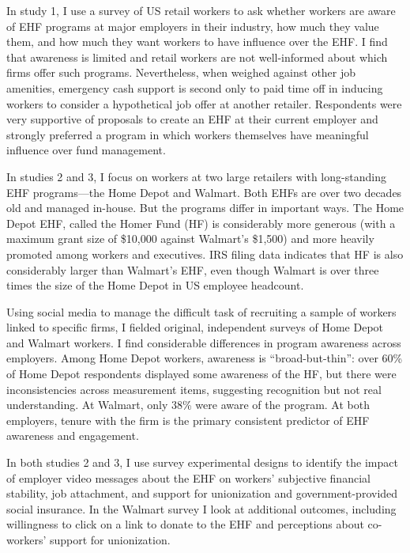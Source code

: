\documentclass[
  11pt,
  oneside]{article}
\begin{document}
In study 1, I use a survey of US retail workers to ask whether workers are aware of EHF programs at major employers in their industry, how much they value them, and how much they want workers to have influence over the EHF. I find that awareness is limited and retail workers are not well-informed about which firms offer such programs. Nevertheless, when weighed against other job amenities, emergency cash support is second only to paid time off in inducing workers to consider a hypothetical job offer at another retailer. Respondents were very supportive of proposals to create an EHF at their current employer and strongly preferred a program in which workers themselves have meaningful influence over fund management.

In studies 2 and 3, I focus on workers at two large retailers with long-standing EHF programs---the Home Depot and Walmart. Both EHFs are over two decades old and managed in-house. But the programs differ in important ways. The Home Depot EHF, called the Homer Fund (HF) is considerably more generous (with a maximum grant size of \$10,000 against Walmart's \$1,500) and more heavily promoted among workers and executives. IRS filing data indicates that HF is also considerably larger than Walmart's EHF, even though Walmart is over three times the size of the Home Depot in US employee headcount.

Using social media to manage the difficult task of recruiting a sample of workers linked to specific firms, I fielded original, independent surveys of Home Depot and Walmart workers. I find considerable differences in program awareness across employers. Among Home Depot workers, awareness is ``broad-but-thin'': over 60\% of Home Depot respondents displayed some awareness of the HF, but there were inconsistencies across measurement items, suggesting recognition but not real understanding. At Walmart, only 38\% were aware of the program. At both employers, tenure with the firm is the primary consistent predictor of EHF awareness and engagement.

In both studies 2 and 3, I use survey experimental designs to identify the impact of employer video messages about the EHF on workers' subjective financial stability, job attachment, and support for unionization and government-provided social insurance. In the Walmart survey I look at additional outcomes, including willingness to click on a link to donate to the EHF and perceptions about co-workers' support for unionization.
\end{document}
